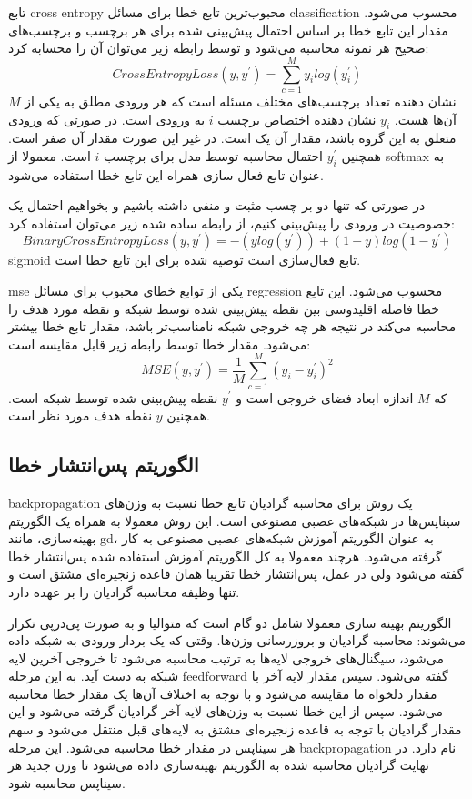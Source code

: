 تابع \gls{cross entropy} محبوب‌ترین تابع خطا برای مسائل \gls{classification}
محسوب می‌شود. مقدار این تابع خطا بر اساس احتمال پیش‌بینی شده برای هر برچسب و
برچسب‌های صحیح هر نمونه محاسبه می‌شود و توسط رابطه زیر می‌توان آن را محسابه کرد:
\begin{equation}
    CrossEntropyLoss(y, y^\prime) = \sum_{c=1}^{M} y_i log(y_i^\prime)
\end{equation}
$M$ نشان دهنده تعداد برچسب‌های مختلف مسئله است که هر ورودی مطلق به یکی از آن‌ها
هست. $y_i$ نشان دهنده اختصاص برچسب $i$ به ورودی است. در صورتی که ورودی متعلق به
این گروه باشد، مقدار آن یک است. در غیر این صورت مقدار آن صفر است. همچنین
$y_i^\prime$ احتمال محاسبه توسط مدل برای برچسب $i$ است. معمولا از softmax به
عنوان تابع فعال سازی همراه این تابع خطا استفاده می‌شود.

در صورتی که تنها دو بر چسب مثبت و منفی داشته باشیم و بخواهیم احتمال یک خصوصیت در
ورودی را پیش‌بینی کنیم، از رابطه ساده شده زیر می‌توان استفاده کرد:
\begin{equation}
    BinaryCrossEntropyLoss(y, y^\prime) = -(y log(y^\prime)) + (1 - y)log(1 - y^\prime)
\end{equation}
sigmoid تابع فعال‌سازی است توصیه شده برای این تابع خطا است.

\gls{mse} یکی از توابع خطای محبوب برای مسائل \gls{regression} محسوب می‌شود. این
تابع خطا فاصله اقلیدوسی بین نقطه پیش‌بینی شده توسط شبکه و نقطه مورد هدف را محاسبه
می‌کند در نتیجه هر چه خروجی شبکه نامناسب‌تر باشد، مقدار تابع خطا بیشتر می‌شود.
مقدار خطا توسط رابطه زیر قابل مقایسه است:
\begin{equation}
    MSE(y, y^\prime) = \frac{1}{M} \sum_{c=1}^{M} (y_i - y_i^\prime)^2
\end{equation}
که $M$ اندازه ابعاد فضای خروجی است و $y^\prime$ نقطه پیش‌بینی شده توسط شبکه است.
همچنین $y$ نقطه هدف مورد نظر است.

\subsection{الگوریتم پس‌انتشار خطا}
\gls{backpropagation} یک روش برای محاسبه گرادیان تابع خطا نسبت به وزن‌های
سیناپس‌ها در شبکه‌های عصبی مصنوعی است. این روش معمولا به همراه یک الگوریتم
بهینه‌سازی، مانند \gls{gd}، به عنوان الگوریتم آموزش شبکه‌های عصبی مصنوعی به کار
گرفته می‌شود. هرچند معمولا به کل الگوریتم آموزش استفاده شده پس‌انتشار خطا گفته
می‌شود ولی در عمل، پس‌انتشار خطا تقریبا همان قاعده زنجیره‌ای مشتق است و تنها
وظیفه محاسبه گرادیان را بر عهده دارد.

الگوریتم بهینه سازی معمولا شامل دو گام است که متوالیا و به صورت پی‌در‌پی تکرار
می‌شوند: محاسبه گرادیان و بروزرسانی وزن‌ها. وقتی که یک بردار ورودی به شبکه داده
می‌شود، سیگنال‌های خروجی لایه‌ها به ترتیب محاسبه می‌شود تا خروجی آخرین لایه شبکه
به دست آید. به این مرحله \gls{feedforward} گفته می‌شود. سپس مقدار لایه آخر با
مقدار دلخواه ما مقایسه می‌شود و با توجه به اختلاف آن‌ها یک مقدار خطا محاسبه
می‌شود. سپس از این خطا نسبت به وزن‌های لایه آخر گرادیان گرفته می‌شود و این مقدار
گرادیان با توجه به قاعده زنجیره‌ای مشتق به لایه‌های قبل منتقل می‌شود و سهم هر
سیناپس در مقدار خطا محاسبه می‌شود. این مرحله \gls{backpropagation} نام دارد. در
نهایت گرادیان محاسبه شده به الگوریتم بهینه‌سازی داده می‌شود تا وزن جدید هر
سیناپس محاسبه شود.

